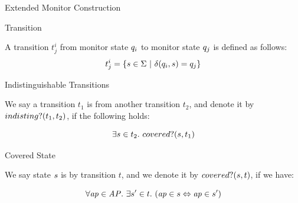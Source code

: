 \begin{frame}{Extended \LTLtri Monitor Construction}


\begin{block}{Transition}

A transition $t_j^i$ from monitor state $q_i$ to monitor 
state $q_j$ is defined as follows:
$$ t_j^i = \{ s \in \Sigma ~ | ~ \delta (q_i, s) = 
q_j\}$$

\end{block}



\begin{block}{Indistinguishable Transitions}

We say a transition $t_1$ is  from another transition 
$t_2$, and denote it by $indisting?(t_1, t_2)$, if the following holds: 
 
$$\exists s \in t_2 . ~ covered?(s, t_1)$$

\end{block}



\begin{block}{Covered State}


We say state $s$ is  by transition $t$, and we denote it 
by $covered?(s, t)$, if we have:

$$ \forall \mathit{ap} \in \mathit{AP}.~ \exists s' \in t. ~(\mathit{ap} \in s 
\Leftrightarrow \mathit{ap} \in s') $$

\end{block}


\end{frame}





